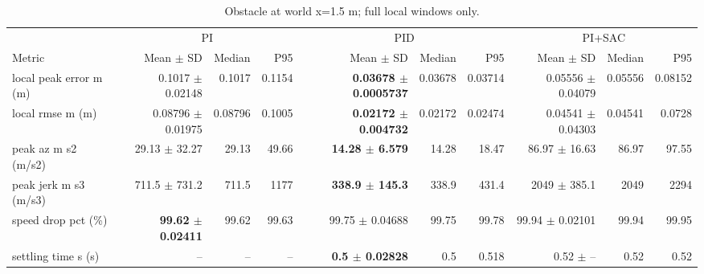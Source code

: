 \begin{table}[t]
\centering
\scriptsize
\caption{Obstacle at world x=1.5 m; full local windows only.}
\label{tab:obstacle-3}
\begin{tabular}{p{}*{9}{r}}
\toprule
 & \multicolumn{3}{c}{PI} & \multicolumn{3}{c}{PID} & \multicolumn{3}{c}{PI+SAC} \\
\cmidrule(lr){2-4}\cmidrule(lr){5-7}\cmidrule(lr){8-10}
Metric & Mean $\pm$ SD & Median & P95 & Mean $\pm$ SD & Median & P95 & Mean $\pm$ SD & Median & P95 \\
\midrule
local peak error m (m) & 0.1017 $\pm$ 0.02148 & 0.1017 & 0.1154 & \textbf{0.03678 $\pm$ 0.0005737} & 0.03678 & 0.03714 & 0.05556 $\pm$ 0.04079 & 0.05556 & 0.08152 \\
local rmse m (m) & 0.08796 $\pm$ 0.01975 & 0.08796 & 0.1005 & \textbf{0.02172 $\pm$ 0.004732} & 0.02172 & 0.02474 & 0.04541 $\pm$ 0.04303 & 0.04541 & 0.0728 \\
peak az m s2 (m/s2) & 29.13 $\pm$ 32.27 & 29.13 & 49.66 & \textbf{14.28 $\pm$ 6.579} & 14.28 & 18.47 & 86.97 $\pm$ 16.63 & 86.97 & 97.55 \\
peak jerk m s3 (m/s3) & 711.5 $\pm$ 731.2 & 711.5 & 1177 & \textbf{338.9 $\pm$ 145.3} & 338.9 & 431.4 & 2049 $\pm$ 385.1 & 2049 & 2294 \\
speed drop pct (\%) & \textbf{99.62 $\pm$ 0.02411} & 99.62 & 99.63 & 99.75 $\pm$ 0.04688 & 99.75 & 99.78 & 99.94 $\pm$ 0.02101 & 99.94 & 99.95 \\
settling time s (s) & -- & -- & -- & \textbf{0.5 $\pm$ 0.02828} & 0.5 & 0.518 & 0.52 $\pm$ -- & 0.52 & 0.52 \\
\bottomrule
\end{tabular}
\end{table}
